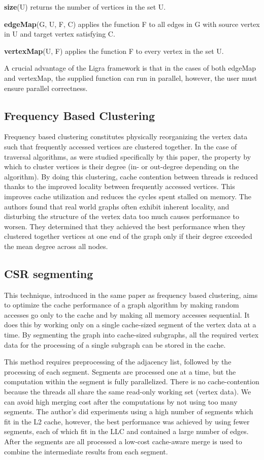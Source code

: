 \textbf{size}(U) returns the number of vertices in the set U.

\textbf{edgeMap}(G, U, F, C) applies the function F to all edges in G with source vertex in U and target vertex satisfying C.

\textbf{vertexMap}(U, F) applies the function F to every vertex in the set U.

A crucial advantage of the Ligra framework is that in the cases of both edgeMap and vertexMap, the supplied function can run in parallel, however, the user must ensure parallel correctness.

\subsection{Frequency Based Clustering}

Frequency based clustering \cite{zhang2016optimizing} constitutes physically reorganizing the vertex data such that frequently accessed vertices are clustered together. In the case of traversal algorithms, as were studied specifically by this paper, the property by which to cluster vertices is their degree (in- or out-degree depending on the algorithm). By doing this clustering, cache contention between threads is reduced thanks to the improved locality between frequently accessed vertices. This improves cache utilization and reduces the cycles spent stalled on memory. The authors found that real world graphs often exhibit inherent locality, and disturbing the structure of the vertex data too much causes performance to worsen. They determined that they achieved the best performance when they clustered together vertices at one end of the graph only if their degree exceeded the mean degree across all nodes.

\subsection{CSR segmenting}

This technique, introduced in the same paper \cite{zhang2016optimizing} as frequency based clustering, aims to optimize the cache performance of a graph algorithm by making random accesses go only to the cache and by making all memory accesses sequential. It does this by working only on a single cache-sized segment of the vertex data at a time. By segmenting the graph into cache-sized subgraphs, all the required vertex data for the processing of a single subgraph can be stored in the cache.

This method requires preprocessing of the adjacency list, followed by the processing of each segment. Segments are processed one at a time, but the computation within the segment is fully parallelized. There is no cache-contention because the threads all share the same read-only working set (vertex data). We can avoid high merging cost after the computations by not using too many segments. The author's did experiments using a high number of segments which fit in the L2 cache, however, the best performance was achieved by using fewer segments, each of which fit in the LLC and contained a large number of edges. After the segments are all processed a low-cost cache-aware merge is used to combine the intermediate results from each segment.

